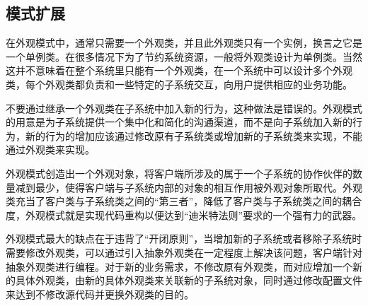 \documentclass[letterpaper,10pt,english]{sphinxmanual}
\begin{document}
\subsection{模式扩展}
\label{\detokenize{structural_patterns/facade:id14}}\begin{description}
\sphinxAtStartPar
在外观模式中，通常只需要一个外观类，并且此外观类只有一个实例，换言之它是一个单例类。在很多情况下为了节约系统资源，一般将外观类设计为单例类。当然这并不意味着在整个系统里只能有一个外观类，在一个系统中可以设计多个外观类，每个外观类都负责和一些特定的子系统交互，向用户提供相应的业务功能。

\sphinxAtStartPar
不要通过继承一个外观类在子系统中加入新的行为，这种做法是错误的。外观模式的用意是为子系统提供一个集中化和简化的沟通渠道，而不是向子系统加入新的行为，新的行为的增加应该通过修改原有子系统类或增加新的子系统类来实现，不能通过外观类来实现。

\sphinxAtStartPar
外观模式创造出一个外观对象，将客户端所涉及的属于一个子系统的协作伙伴的数量减到最少，使得客户端与子系统内部的对象的相互作用被外观对象所取代。外观类充当了客户类与子系统类之间的“第三者”，降低了客户类与子系统类之间的耦合度，外观模式就是实现代码重构以便达到“迪米特法则”要求的一个强有力的武器。

\sphinxAtStartPar
外观模式最大的缺点在于违背了“开闭原则”，当增加新的子系统或者移除子系统时需要修改外观类，可以通过引入抽象外观类在一定程度上解决该问题，客户端针对抽象外观类进行编程。对于新的业务需求，不修改原有外观类，而对应增加一个新的具体外观类，由新的具体外观类来关联新的子系统对象，同时通过修改配置文件来达到不修改源代码并更换外观类的目的。

\end{description}
\end{document}
